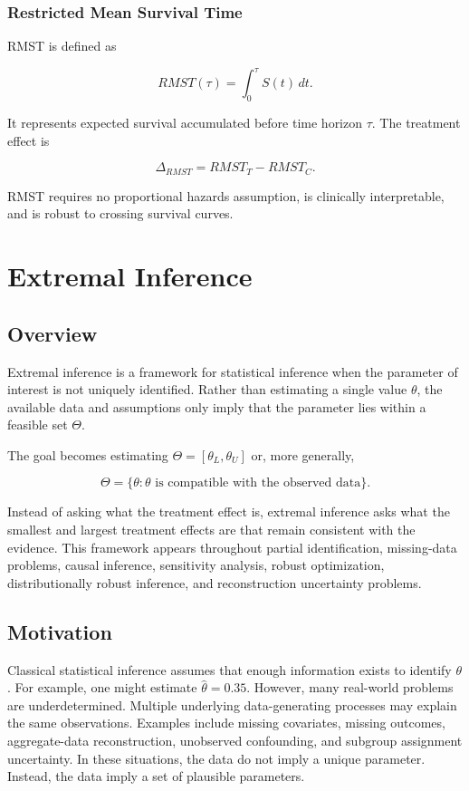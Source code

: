 \documentclass[11pt]{article}
\begin{document}
\subsubsection*{Restricted Mean Survival Time}

RMST is defined as

\[RMST(\tau)=\int_0^\tau S(t)\,dt.\]

It represents expected survival accumulated before time horizon $\tau$.
The treatment effect is

\[\Delta_{RMST}=RMST_T-RMST_C.\]

RMST requires no proportional hazards assumption, is clinically interpretable, and is robust to crossing survival curves.

\section{Extremal Inference}

\subsection*{Overview}

Extremal inference is a framework for statistical inference when the parameter of interest is not uniquely identified.
Rather than estimating a single value $\theta$, the available data and assumptions only imply that the parameter lies within a feasible set $\Theta$.

The goal becomes estimating $\Theta=[\theta_L,\theta_U]$ or, more generally,

\[\Theta=\{\theta:\theta \text{ is compatible with the observed data}\}.\]

Instead of asking what the treatment effect is, extremal inference asks what the smallest and largest treatment effects are that remain consistent with the evidence.
This framework appears throughout partial identification, missing-data problems, causal inference, sensitivity analysis, robust optimization, distributionally robust inference, and reconstruction uncertainty problems.

\subsection*{Motivation}

Classical statistical inference assumes that enough information exists to identify $\theta$. For example, one might estimate $\hat{\theta}=0.35$.
However, many real-world problems are underdetermined. Multiple underlying data-generating processes may explain the same observations.
Examples include missing covariates, missing outcomes, aggregate-data reconstruction, unobserved confounding, and subgroup assignment uncertainty.
In these situations, the data do not imply a unique parameter. Instead, the data imply a set of plausible parameters.
\end{document}
